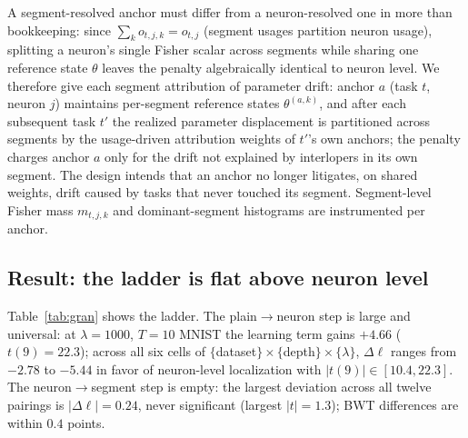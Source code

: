 \documentclass[review,12pt,number]{elsarticle}
\begin{document}
A segment-resolved anchor must differ from a neuron-resolved one in more
than bookkeeping: since $\sum_k o_{t,j,k} = o_{t,j}$ (segment usages
partition neuron usage), splitting a neuron's single Fisher scalar across
segments while sharing one reference state $\theta$ leaves the penalty
algebraically identical to neuron level. We therefore give each segment
attribution of parameter drift: anchor $a$ (task $t$, neuron $j$) maintains
per-segment reference states $\theta^{(a,k)}$, and after each subsequent
task $t'$ the realized parameter displacement is partitioned across segments
by the usage-driven attribution weights of $t'$'s own anchors; the penalty
charges anchor $a$ only for the drift not explained by interlopers in its
own segment. The design intends that an anchor no longer litigates, on
shared weights, drift caused by tasks that never touched its segment.
Segment-level Fisher mass $m_{t,j,k}$ and dominant-segment histograms are
instrumented per anchor.

\subsection{Result: the ladder is flat above neuron level}

Table~\ref{tab:gran} shows the ladder. The plain$\to$neuron step is large
and universal: at $\lambda{=}1000$, $T{=}10$ MNIST the learning term gains
$+4.66$ ($t(9){=}22.3$); across all six cells of
$\{$dataset$\}\times\{$depth$\}\times\{\lambda\}$, $\Delta\ell$ ranges from
$-2.78$ to $-5.44$ in favor of neuron-level localization with
$|t(9)| \in [10.4, 22.3]$. The neuron$\to$segment step is empty: the
largest deviation across all twelve pairings is $|\Delta\ell| = 0.24$,
never significant (largest $|t| = 1.3$); BWT differences are within
$0.4$ points.
\end{document}
